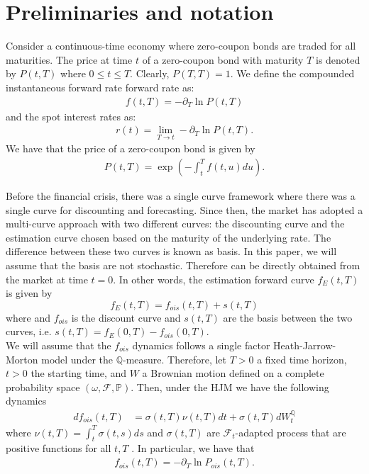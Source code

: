 \documentclass[a4paper,10pt]{article}
\newcommand{\1}{\mathbf{1}}
\begin{document}
\section{Preliminaries and notation}\label{sec:Notation}
Consider a continuous-time economy where zero-coupon bonds are traded for all maturities. The price at time $t$ of a zero-coupon bond with maturity $T$ is denoted by $P(t,T)$ where $0\leq t \leq T$. Clearly, $P(T,T)=1$. We define the compounded instantaneous forward rate forward rate as:
\begin{eqnarray*}
f(t,T)= -\partial_{T}\ln P(t,T)
\end{eqnarray*}
and the spot interest rates as:
\begin{eqnarray*}
r(t)=\lim_{T\longrightarrow t} -\partial_{T}\ln P(t,T).
\end{eqnarray*}
We have that the price of a zero-coupon bond is given by
\begin{eqnarray*}
P(t,T)=\exp\left(-\int^{T}_{t} f(t,u) du\right).
\end{eqnarray*}

Before the financial crisis, there was a single curve framework where there was a single curve for discounting and forecasting. Since then, the market has adopted a multi-curve approach with two different curves: the discounting curve and the estimation curve chosen based on the maturity of the underlying rate. The difference between these two curves is known as basis. In this paper, we will assume that the basis are not stochastic. Therefore can be directly obtained from the market at time $t=0$. In other words, the estimation forward curve $f_{E}(t, T)$ is given by
\begin{equation}\label{estimation_forward_rate_curve}
f_{E}(t,T) = f_{ois}(t,T) + s(t,T)
\end{equation}
where and $f_{ois}$ is the discount curve and $s(t,T)$ are the basis between the two curves, i.e. $s(t,T)= f_{E}(0,T) - f_{ois}(0,T)$.\\

We will assume that the $f_{ois}$ dynamics follows a single factor Heath-Jarrow-Morton model under the $\mathbb{Q}$-measure. Therefore, let $T>0$ a fixed time horizon, $t>0$ the starting time, and $W$ a Brownian motion defined on a complete probability space $(\omega, \mathcal{F}, \mathbb{P})$. Then, under the HJM we have the following dynamics
\begin{align}\label{ois_forward_rate_curve}
df_{ois}(t,T) &= \sigma(t,T)\nu(t,T)dt + \sigma(t,T)dW^{\mathbb{Q}}_t
\end{align}
where $\nu(t,T)=\int_{t}^{T}\sigma(t,s)ds$ and $\sigma(t, T)$ are $\mathcal{F}_{t}$-adapted process that are positive functions for all $t,T$ . In particular, we have that
\begin{eqnarray*}
f_{ois}(t,T)= -\partial_{T}\ln P_{ois}(t,T).
\end{eqnarray*}
\end{document}
